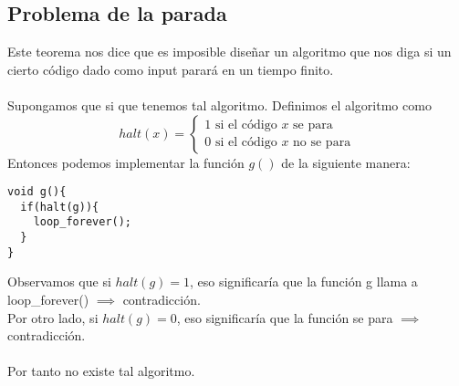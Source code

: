 \documentclass[leqno]{article}
\begin{document}
\subsection{Problema de la parada}
Este teorema nos dice que es imposible diseñar un algoritmo que nos diga si un cierto código dado como input parará en un tiempo finito.\\
\\
Supongamos que si que tenemos tal algoritmo. Definimos el algoritmo como
\[
halt(x) = \begin{cases}
  1 \text{ si el código } x \text{ se para}\\
  0 \text{ si el código } x \text{ no se para}
\end{cases}
\] 
Entonces podemos implementar la función $g()$ de la siguiente manera:
\begin{lstlisting}
void g(){
  if(halt(g)){
	loop_forever();
  }
}
\end{lstlisting}
Observamos que si $halt(g)=1$, eso significaría que la función g llama a loop_forever() $\implies$ contradicción.\\
Por otro lado, si $halt(g)=0$, eso significaría que la función se para $\implies$ contradicción.\\
\\
Por tanto no existe tal algoritmo.
\end{document}
